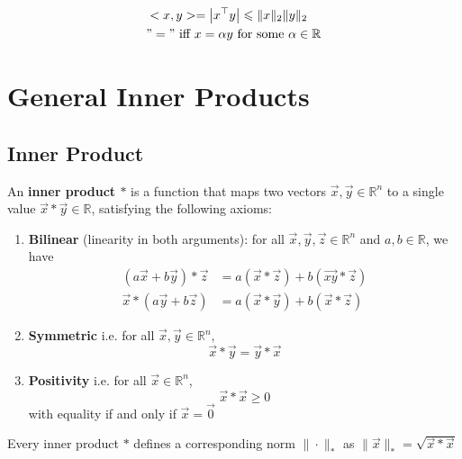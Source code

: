 \documentclass[11pt]{elegantbook}
\begin{document}
$$
\begin{aligned}
&<x,y>=\left|x^{\top} y\right| \leqslant\|x\|_2\|y\|_2 \\
&"=" \text { iff } x=\alpha y \text { for some } \alpha \in \mathbb{R}
\end{aligned}
$$

\section{General Inner Products}
\subsection{ Inner Product}
\begin{definition}\end{definition}
An \textbf{inner product $*$} is a function that maps two vectors $\vec{x},\vec{y}\in \mathbb{R}^n$ to a single value $\vec{x}*\vec{y}\in \mathbb{R}$, satisfying the following axioms:
\begin{enumerate}
    \item \textbf{Bilinear} (linearity in both arguments): for all $\vec{x},\vec{y},\vec{z}\in \mathbb{R}^n$ and $a,b\in \mathbb{R}$, we have
    \begin{equation}
        \begin{aligned}
            (a \vec{x}+ b\vec{y})*\vec{z}&=a(\vec{x}*\vec{z})+b(\vec{xy}*\vec{z})\\
            \vec{x}*(a \vec{y}+b \vec{z})&=a(\vec{x}* \vec{y})+ b(\vec{x}* \vec{z})
        \end{aligned}
        \nonumber
    \end{equation}
    \item \textbf{Symmetric} i.e. for all $\vec{x},\vec{y}\in \mathbb{R}^n$, $$\vec{x}* \vec{y}=\vec{y}* \vec{x}$$
    \item \textbf{Positivity} i.e. for all $\vec{x}\in \mathbb{R}^n$, $$\vec{x}* \vec{x}\geq 0$$ with equality if and only if $\vec{x}=\vec{0}$
\end{enumerate}

\begin{definition}
    Every inner product $*$ defines a corresponding norm $\|\cdot\|_*$ as $\|\vec{x}\|_*=\sqrt{\vec{x}*\vec{x}}$
\end{definition}
\end{document}
